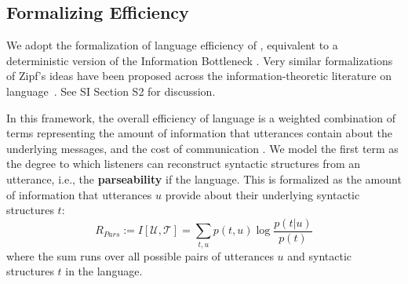 \documentclass[9pt,twocolumn,twoside,lineno]{pnas-new}
\newcommand{\key}[1]{\textbf{#1}}
\begin{document}
{\subsection*{Formalizing Efficiency}
We adopt the formalization of language efficiency of \cite{ferreri2003least}, equivalent to a deterministic version of the Information Bottleneck \cite{zaslavsky2018efficient}.
Very similar formalizations of Zipf's ideas have been proposed across the information-theoretic literature on language~\cite{frank2012predicting,kemp2012kinship,regier2015word}. 
See SI Section S2 for discussion.

In this framework, the overall efficiency of language is a weighted combination of terms representing the amount of information that utterances contain about the underlying messages, and the cost of communication  \cite{ferreri2003least,frank2012predicting,kemp2012kinship,regier2015word,zaslavsky2018efficient}. We model the first term as the 
 degree to which listeners can reconstruct syntactic structures from an utterance, i.e., the \key{parseability} if the language.
 This is formalized as the amount of information that utterances $u$ provide about their underlying syntactic structures $t$:
\begin{equation}
	R_{Pars} := I[\mathcal{U},\mathcal{T}] = \sum_{t,u} p(t,u) \log \frac{p(t|u)}{p(t)}
\end{equation}
where the sum runs over all possible pairs of utterances $u$ and syntactic structures $t$ in the language.

}
\end{document}
